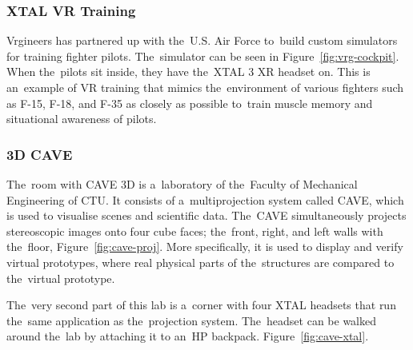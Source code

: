 \subsubsection*{XTAL VR Training}

Vrgineers has partnered up with the~U.S. Air Force to~build custom simulators for training fighter pilots. The~simulator can be seen in Figure~\ref{fig:vrg-cockpit}. When the~pilots sit inside, they have the~XTAL 3 XR headset on. This is an~example of VR training that mimics the~environment of various fighters such as F-15, F-18, and F-35 as closely as possible to~train muscle memory and situational awareness of pilots.~\cite{vrginners-classroom}


\subsubsection*{3D CAVE}
The~room with CAVE 3D is a~laboratory of the~Faculty of Mechanical Engineering of CTU. It consists of a~multiprojection system called CAVE, which is used to visualise scenes and scientific data. The~CAVE simultaneously projects stereoscopic images onto four cube faces; the~front, right, and left walls with the~floor, Figure~\ref{fig:cave-proj}. More specifically, it is used to display and verify virtual prototypes, where real physical parts of the~structures are compared to the~virtual prototype.~\cite{cave-lab}

The~very second part of this lab is a~corner with four XTAL headsets that run the~same application as the~projection system. The~headset can be walked around the~lab by attaching it to an~HP backpack. Figure~\ref{fig:cave-xtal}.


